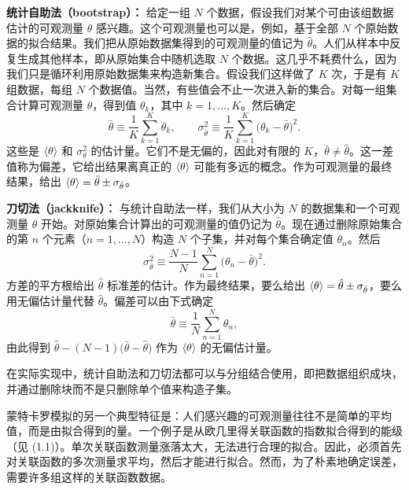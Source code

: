 \textbf{统计自助法（bootstrap）：} 给定一组 $N$ 个数据，假设我们对某个可由该组数据估计的可观测量 $\theta$ 感兴趣。这个可观测量也可以是，例如，基于全部 $N$ 个原始数据的拟合结果。我们把从原始数据集得到的可观测量的值记为 $\hat{\theta}$。人们从样本中反复生成其他样本，即从原始集合中随机选取 $N$ 个数据。这几乎不耗费什么，因为我们只是循环利用原始数据集来构造新集合。假设我们这样做了 $K$ 次，于是有 $K$ 组数据，每组 $N$ 个数据值。当然，有些值会不止一次进入新的集合。对每一组集合计算可观测量 $\theta$，得到值 $\theta_k$，其中 $k = 1, \ldots, K$。然后确定
\begin{equation}
  \bar{\theta} \equiv \frac{1}{K}\sum_{k=1}^{K}\theta_k, \qquad
  \sigma_{\bar{\theta}}^2 \equiv \frac{1}{K}\sum_{k=1}^{K}\big(\theta_k - \bar{\theta}\big)^2 .
\end{equation}
这些是 $\left\langle \theta \right\rangle$ 和 $\sigma_\theta^2$ 的估计量。它们不是无偏的，因此对有限的 $K$，$\bar{\theta} \neq \hat{\theta}$。这一差值称为偏差，它给出结果离真正的 $\left\langle \theta \right\rangle$ 可能有多远的概念。作为可观测量的最终结果，给出 $\left\langle \theta \right\rangle = \bar{\theta} \pm \sigma_{\bar{\theta}}$。

\textbf{刀切法（jackknife）：} 与统计自助法一样，我们从大小为 $N$ 的数据集和一个可观测量 $\theta$ 开始。对原始集合计算出的可观测量的值仍记为 $\hat{\theta}$。现在通过删除原始集合的第 $n$ 个元素（$n = 1, \ldots, N$）构造 $N$ 个子集，并对每个集合确定值 $\theta_n$。然后
\begin{equation}
  \sigma_{\bar{\theta}}^2 \equiv \frac{N-1}{N}\sum_{n=1}^{N}\big(\theta_n - \bar{\theta}\big)^2 .
\end{equation}
方差的平方根给出 $\hat{\theta}$ 标准差的估计。作为最终结果，要么给出 $\left\langle \theta \right\rangle = \hat{\theta} \pm \sigma_{\hat{\theta}}$，要么用无偏估计量代替 $\hat{\theta}$。偏差可以由下式确定
\begin{equation}
  \bar{\theta} \equiv \frac{1}{N}\sum_{n=1}^{N}\theta_n,
\end{equation}
由此得到 $\hat{\theta} - (N-1)\big(\bar{\theta} - \hat{\theta}\big)$ 作为 $\left\langle \theta \right\rangle$ 的无偏估计量。

在实际实现中，统计自助法和刀切法都可以与分组结合使用，即把数据组织成块，并通过删除块而不是只删除单个值来构造子集。

蒙特卡罗模拟的另一个典型特征是：人们感兴趣的可观测量往往不是简单的平均值，而是由拟合得到的量。一个例子是从欧几里得关联函数的指数拟合得到的能级（见 (1.1)）。单次关联函数测量涨落太大，无法进行合理的拟合。因此，必须首先对关联函数的多次测量求平均，然后才能进行拟合。然而，为了朴素地确定误差，需要许多组这样的关联函数数据。

